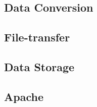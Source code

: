 \subsection{Data Conversion}

\FloatBarrier
\subsection{File-transfer}

\FloatBarrier
\subsection{Data Storage}

\FloatBarrier
\subsection{Apache}

\FloatBarrier
